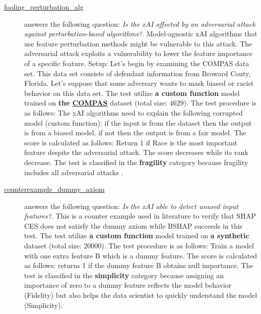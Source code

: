 \begin{description}
\item[\href{https://github.com/Karim-53/Compare-xAI/tree/main/tests/fooling_perturbation_alg.py}{fooling\_perturbation\_alg}] answers the following question: \emph{Is the xAI affected by an adversarial attack against perturbation-based algorithms?}.
Model-agnostic xAI algorithms that use feature perturbation methods might be vulnerable to this attack. The adversarial attack exploits a vulnerability to lower the feature importance of a specific feature. Setup: Let's begin by examining the COMPAS data set. This data set consists of defendant information from Broward Couty, Florida. Let's suppose that some adversary wants to mask biased or racist behavior on this data set.
 The test utilize \textbf{a custom function} model trained on \textbf{the \href{https://github.com/propublica/compas-analysis/blob/master/compas-scores-two-years.csv}{COMPAS}} dataset (total size: 4629).
 The test procedure is as follows: The xAI algorithms need to explain the following corrupted model (custom function): if the input is from the dataset then the output is from a biased model. if not then the output is from a fair model.
 The score is calculated as follows: Return 1 if Race is the most important feature despite the adversarial attack. The score decreases while its rank decrease.
 The test is classified in the \textbf{fragility} category because fragility includes all adversarial attacks \citep{ghorbani2019interpretation}.


\item[\href{https://github.com/Karim-53/Compare-xAI/tree/main/tests/dummy_axiom.py}{counterexample\_dummy\_axiom}] answers the following question: \emph{Is the xAI able to detect unused input features?}.
This is a counter example used in literature to verify that SHAP CES does not satisfy the dummy axiom while BSHAP succeeds in this test.
 The test utilize \textbf{a custom function} model trained on \textbf{a synthetic} dataset (total size: 20000).
 The test procedure is as follows: Train a model with one extra feature B which is a dummy feature.
 The score is calculated as follows: returns 1 if the dummy feature B obtains null importance.
 The test is classified in the \textbf{simplicity} category because assigning an importance of zero to a dummy feature reflects the model behavior (Fidelity) but also helps the data scientist to quickly understand the model (Simplicity).



\end{description}
